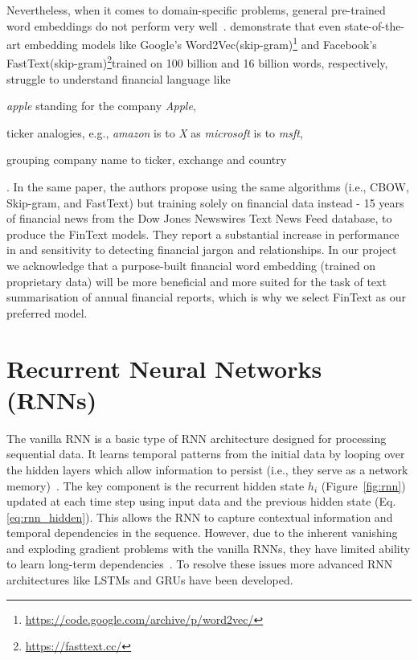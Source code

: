 Nevertheless, when it comes to domain-specific problems, general pre-trained word embeddings do not perform very well~\cite{rahimikia2021realised}.
demonstrate that even state-of-the-art embedding models like Google's Word2Vec(skip-gram)\footnote{\url{https://code.google.com/archive/p/word2vec/}} and Facebook's FastText(skip-gram)\footnote{\url{https://fasttext.cc/}}trained on 100 billion and 16 billion words, respectively, struggle to understand financial language like \begin{enumerate*}
    \item \emph{apple} standing for the company \emph{Apple},
    \item ticker analogies, e.g., \emph{amazon} is to \emph{X} as \emph{microsoft} is to \emph{msft},
    \item grouping company name to ticker, exchange and country
\end{enumerate*}.
In the same paper, the authors propose using the same algorithms (i.e., CBOW, Skip-gram, and FastText) but training solely on financial data instead - 15 years of financial news from the Dow Jones Newswires Text News Feed database, to produce the FinText models.
They report a substantial increase in performance in and sensitivity to detecting financial jargon and relationships.
In our project we acknowledge that a purpose-built financial word embedding (trained on proprietary data) will be more beneficial and more suited for the task of text summarisation of annual financial reports, which is why we select FinText as our preferred model.

\section{Recurrent Neural Networks (RNNs)}\label{sec:rnn}
The vanilla RNN is a basic type of RNN architecture designed for processing sequential data.
It learns temporal patterns from the initial data by looping over the hidden layers which allow information to persist (i.e., they serve as a network memory)~\cite{olah2015understandingLSTM}.
The key component is the recurrent hidden state $h_i$ (Figure~\ref{fig:rnn}) updated at each time step using input data and the previous hidden state (Eq.\ref{eq:rnn_hidden}).
This allows the RNN to capture contextual information and temporal dependencies in the sequence.
However, due to the inherent vanishing and exploding gradient problems with the vanilla RNNs, they have limited ability to learn long-term dependencies~\cite{bengio1994learning}.
To resolve these issues more advanced RNN architectures like LSTMs and GRUs have been developed.

